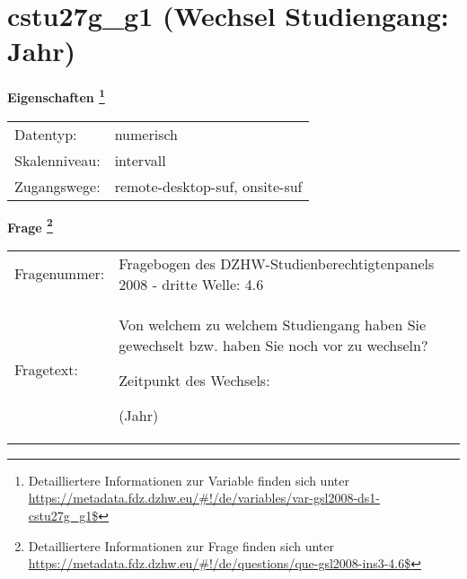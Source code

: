
    \setcounter{footnote}{0}

    \vspace*{-1.8cm}
	\section{cstu27g\_g1 (Wechsel Studiengang: Jahr)}
	\label{section:cstu27g_g1}



    \vspace*{0.5cm}
    \noindent\textbf{Eigenschaften
	\footnote{Detailliertere Informationen zur Variable finden sich unter
		\url{https://metadata.fdz.dzhw.eu/\#!/de/variables/var-gsl2008-ds1-cstu27g_g1$}}}\\
	\begin{tabularx}{\hsize}{@{}lX}
	Datentyp: & numerisch \\
	Skalenniveau: & intervall \\
	Zugangswege: &
	  remote-desktop-suf, 
	  onsite-suf
 \\
    \end{tabularx}



				\vspace*{0.5cm}
                \noindent\textbf{Frage
	                \footnote{Detailliertere Informationen zur Frage finden sich unter
		              \url{https://metadata.fdz.dzhw.eu/\#!/de/questions/que-gsl2008-ins3-4.6$}}}\\
				\begin{tabularx}{\hsize}{@{}lX}
					Fragenummer: &
					  Fragebogen des DZHW-Studienberechtigtenpanels 2008 - dritte Welle:
					  4.6
 \\
					Fragetext: & Von welchem zu welchem Studiengang haben Sie gewechselt bzw. haben Sie noch vor zu wechseln?\par  Zeitpunkt des Wechsels:\par  (Jahr) \\
				\end{tabularx}





